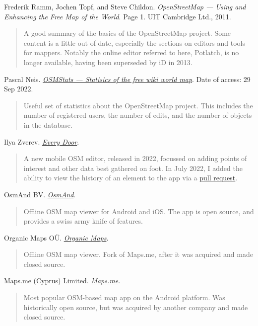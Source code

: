 \documentclass[]{final_report}
\begin{document}
\begin{thebibliography}{99}
 Frederik Ramm, Jochen Topf, and Steve Childon. \emph{OpenStreetMap --- Using and Enhancing the Free Map of the World}. Page 1. UIT Cambridge Ltd., 2011.
\begin{quote}
    A good summary of the basics of the OpenStreetMap project. Some content is a little out of date, especially the sections on editors and tools for mappers. Notably the online editor referred to here, Potlatch, is no longer available, having been superseded by iD in 2013.
\end{quote}
 Pascal Neis. \emph{\href{https://osmstats.neis-one.org/?item=members}{OSMStats --- Statisics of the free wiki world map}}. Date of access: 29 Sep 2022.
\begin{quote}
    Useful set of statistics about the OpenStreetMap project. This includes the number of registered users, the number of edits, and the number of objects in the database.
\end{quote}
 Ilya Zverev. \emph{\href{https://every-door.app/}{Every Door}}.
\begin{quote}
    A new mobile OSM editor, released in 2022, focussed on adding points of interest and other data best gathered on foot. In July 2022, I added the ability to view the history of an element to the app via a \href{https://github.com/Zverik/every_door/pull/338}{pull request}.
\end{quote}
 OsmAnd BV\@. \emph{\href{https://osmand.net/}{OsmAnd}}.
\begin{quote}
    Offline OSM map viewer for Android and iOS\@. The app is open source, and provides a swiss army knife of features.
\end{quote}
 Organic Maps OÜ\@. \emph{\href{https://organicmaps.app/}{Organic Maps}}.
\begin{quote}
    Offline OSM map viewer. Fork of Maps.me, after it was acquired and made closed source.
\end{quote}
 Maps.me (Cyprus) Limited. \emph{\href{https://maps.me}{Maps.me}}.
\begin{quote}
    Most popular OSM-based map app on the Android platform. Was historically open source, but was acquired by another company and made closed source.

\end{quote}
\end{thebibliography}
\end{document}
